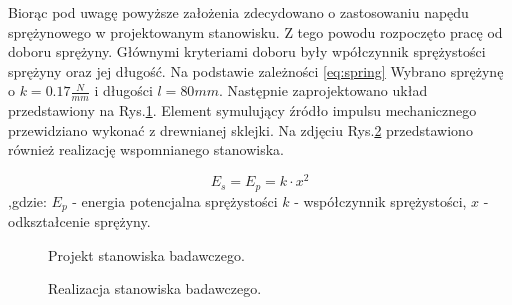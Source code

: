 \indent %
Biorąc pod uwagę powyższe założenia zdecydowano o zastosowaniu napędu sprężynowego w projektowanym stanowisku. Z tego powodu rozpoczęto pracę od doboru sprężyny. Głównymi kryteriami doboru były wpółczynnik sprężystości sprężyny oraz jej długość. Na podstawie zależności \ref{eq:spring} Wybrano sprężynę o $k=0.17\frac{N}{mm}$ i długości $l=80mm$. Następnie zaprojektowano układ przedstawiony na Rys.\ref{fig:test_stand}. Element symulujący źródło impulsu mechanicznego przewidziano wykonać z drewnianej sklejki. Na zdjęciu Rys.\ref{fig:test_stand_photo} przedstawiono również realizację wspomnianego stanowiska.

\begin{equation}
E_s = E_p = k \cdot x^2
\label{eq:spring}
\end{equation}
,gdzie: $E_p$ - energia potencjalna sprężystości $k$ - współczynnik sprężystości, $x$ - odkształcenie sprężyny.


\begin{figure}[htbp]
\centering
{}%
\caption{Projekt stanowiska badawczego.}
\label{fig:test_stand}
\end{figure}

\begin{figure}[htbp]
\centering
{}%
\caption{Realizacja stanowiska badawczego.}
\label{fig:test_stand_photo}
\end{figure}